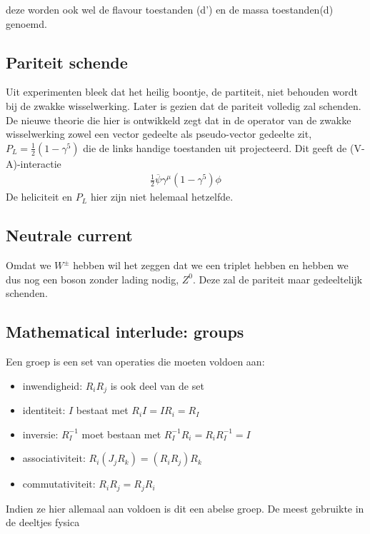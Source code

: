 \documentclass[../main.tex]{subfiles}
\begin{document}
deze worden ook wel de flavour toestanden (d') en de massa toestanden(d) genoemd.

\subsection{Pariteit schende}%
\label{sub:pariteit_schende}

Uit experimenten bleek dat het heilig boontje, de partiteit, niet behouden wordt bij de zwakke wisselwerking. Later is gezien dat de pariteit volledig zal schenden. De nieuwe theorie die hier is ontwikkeld zegt dat in de operator van de zwakke wisselwerking zowel een vector gedeelte als pseudo-vector gedeelte zit, $P_L= \frac{1}{2} (1-\gamma^5)$ die de links handige toestanden uit projecteerd. Dit geeft de (V-A)-interactie
\begin{equation}
    \begin{aligned}
        \label{eq:v_a_int}
        \frac{1}{2} \overline \psi \gamma^\mu (1-\gamma^5) \phi
    \end{aligned}
\end{equation}
De heliciteit en $P_L$ hier zijn niet helemaal hetzelfde.

\subsection{Neutrale current}%
\label{sub:neutrale_current}

Omdat we $W^\pm$ hebben wil het zeggen dat we een triplet hebben en hebben we dus nog een boson zonder lading nodig, $Z^0$. Deze zal de pariteit maar gedeeltelijk schenden.

\subsection{Mathematical interlude: groups}%
\label{sub:mathematical_interlude_groups}

Een groep is een set van operaties die moeten voldoen aan:
\begin{itemize}
    \item inwendigheid: $R_iR_j$ is ook deel van de set
    \item identiteit: $I$ bestaat met $R_iI = IR_i = R_I$
    \item inversie: $R_I^{-1}$ moet bestaan met $R_I^{-1}R_i=R_iR_I^{-1}=I$
    \item associativiteit: $R_i(J_jR_k)=(R_iR_j)R_k$
    \item commutativiteit: $R_iR_j=R_jR_i$
\end{itemize}
Indien ze hier allemaal aan voldoen is dit een abelse groep. De meest gebruikte in de deeltjes fysica
\end{document}
